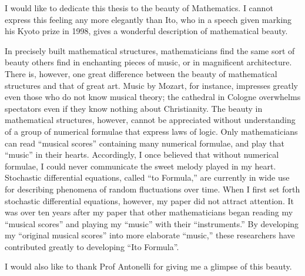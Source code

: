 

I would like to dedicate this thesis to the beauty of Mathematics. I cannot express this feeling any more elegantly than Ito, who in a speech given marking his Kyoto prize in 1998, gives a wonderful description of mathematical beauty.

\begin{displayquote}
	In precisely built mathematical structures, mathematicians find the same sort of beauty others find in enchanting pieces of music, or in magnificent architecture. There is, however, one great difference between the beauty of mathematical structures and that of great art. Music by Mozart, for instance, impresses greatly even those who do not know musical theory; the cathedral in Cologne overwhelms spectators even if they know nothing about Christianity. The beauty in mathematical structures, however, cannot be appreciated without understanding of a group of numerical formulae that express laws of logic. Only mathematicians can read “musical scores” containing many numerical formulae, and play that “music” in their hearts. Accordingly, I once believed that without numerical formulae, I could never communicate the sweet melody played in my heart. Stochastic differential equations, called “to Formula,” are currently in wide use for describing phenomena of random fluctuations over time. When I first set forth stochastic differential equations, however, my paper did not attract attention. It was over ten years after my paper that other mathematicians began reading my “musical scores” and playing my “music” with their “instruments.” By developing my “original musical scores” into more elaborate “music,” these researchers have contributed greatly to developing “Ito Formula”.
\end{displayquote}

I would also like to thank Prof Antonelli for giving me a glimpse of this beauty.


